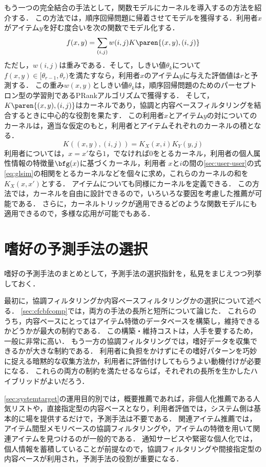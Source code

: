 もう一つの完全結合の手法として，関数モデルにカーネルを導入する\cite{icml:04:06}の方法を紹介する．
この方法では，順序回帰問題に帰着させてモデルを獲得する．利用者$x$がアイテム$y$を好む度合いを次の関数でモデル化する．
\[
f(x,y)=\sum_{(i,j)}w(i,j)K\paren{(x,y),(i,j)}
\]
ただし，$w(i,j)$は重みである．そして，しきい値$\theta_k$について$f(x,y)\in[\theta_{r-1},\theta_r)$を満たすなら，利用者$x$のアイテム$y$に与えた評価値は$r$と予測する．
この重み$w(x,y)$としきい値$\theta_k$は，順序回帰問題のためのパーセプトロン型の学習則であるPRankアルゴリズム\cite{nips:02:01}で獲得する．
そして，$K\paren{(x,y),(i,j)}$はカーネル\cite{jb:036:00}であり，協調と内容ベースフィルタリングを結合するときに中心的な役割を果たす．
この利用者$x$とアイテム$y$の対についてのカーネルは，適当な仮定のもと，利用者とアイテムそれぞれのカーネルの積となる．
\[
 K((x,y),(i,j))=K_X(x,i)K_Y(y,j)
\]
利用者については，$x=x'$なら$1$，でなければ$0$をとるカーネル，利用者の個人属性情報の特徴量$\bfg(x)$に基づくカーネル，利用者
$x$と$i$の間の\ref{sec:user-user}の式\eqref{eq:glsim}の相関をとるカーネルなどを個々に求め，これらのカーネルの和を$K_X(x,x')$とする．
アイテムについても同様にカーネルを定義できる．
この方法では，カーネルを自由に設計できるので，いろいろな要因を考慮した推薦が可能である．
さらに，カーネルトリックが適用できるどのような関数モデルにも適用できるので，多様な応用が可能でもある．

\section{嗜好の予測手法の選択}
\label{sec:rsselect}

嗜好の予測手法のまとめとして，予測手法の選択指針を，私見をまじえつつ列挙しておく．

最初に，協調フィルタリングか内容ベースフィルタリングかの選択について述べる．
\ref{sec:cfcbfcomp}では，両方の手法の長所と短所について論じた．
これらのうち，内容ベースにとってはアイテム特徴のデータベースを構築し，維持できるかどうかが最大の制約である．
この構築・維持コストは，人手を要するため，一般に非常に高い．
もう一方の協調フィルタリングでは，嗜好データを収集できるかが大きな制約である．
利用者に負担をかけずにその嗜好パターンを巧妙に捉える暗黙的な収集方法か，利用者に評価付けしてもらうよい動機付けが必要になる．
これらの両方の制約を満たせるならば，それぞれの長所を生かしたハイブリッドがよいだろう．

\ref{sec:systemtarget}の運用目的別では，概要推薦であれば，非個人化推薦である人気リストや，直接指定型の内容ベースとなり，利用者評価では，システム側は基本的に場を提供するだけで，予測手法は不要である．
関連アイテム推薦では，アイテム間型メモリベースの協調フィルタリングや，アイテムの特徴を用いて関連アイテムを見つけるのが一般的である．
通知サービスや緊密な個人化では，個人情報を蓄積していることが前提なので，協調フィルタリングや間接指定型の内容ベースが利用され，予測手法の役割が重要になる．

